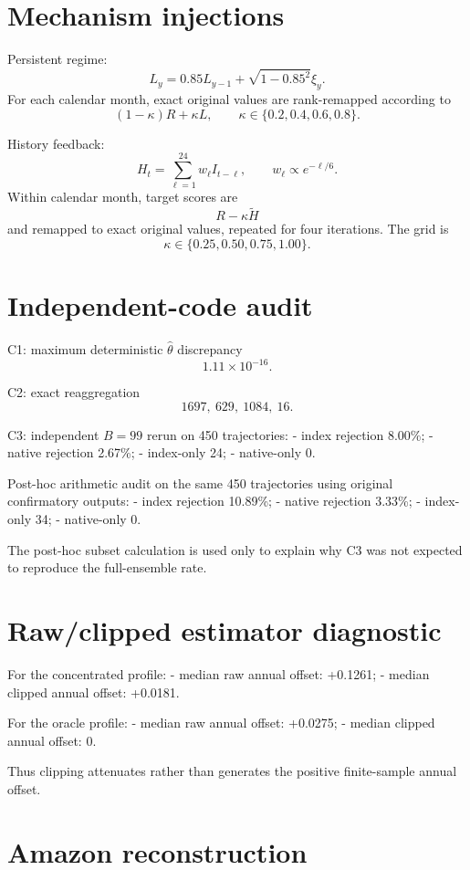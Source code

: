 \section{Mechanism injections}\label{mechanism-injections}

Persistent regime: \[
L_y=0.85L_{y-1}+\sqrt{1-0.85^2}\xi_y.
\] For each calendar month, exact original values are rank-remapped according to \[
(1-\kappa)R+\kappa L,
\qquad
\kappa\in\{0.2,0.4,0.6,0.8\}.
\]

History feedback: \[
H_t=\sum_{\ell=1}^{24}w_\ell I_{t-\ell},
\qquad
w_\ell\propto e^{-\ell/6}.
\] Within calendar month, target scores are \[
R-\kappa\widetilde H
\] and remapped to exact original values, repeated for four iterations. The grid is \[
\kappa\in\{0.25,0.50,0.75,1.00\}.
\]

\section{Independent-code audit}\label{independent-code-audit}

C1: maximum deterministic \(\hat\theta\) discrepancy \[
1.11\times10^{-16}.
\]

C2: exact reaggregation \[
1697,\ 629,\ 1084,\ 16.
\]

C3: independent \(B=99\) rerun on 450 trajectories: - index rejection 8.00\%; - native rejection 2.67\%; - index-only 24; - native-only 0.

Post-hoc arithmetic audit on the same 450 trajectories using original confirmatory outputs: - index rejection 10.89\%; - native rejection 3.33\%; - index-only 34; - native-only 0.

The post-hoc subset calculation is used only to explain why C3 was not expected to reproduce the full-ensemble rate.

\section{Raw/clipped estimator diagnostic}\label{rawclipped-estimator-diagnostic}

For the concentrated profile: - median raw annual offset: +0.1261; - median clipped annual offset: +0.0181.

For the oracle profile: - median raw annual offset: +0.0275; - median clipped annual offset: 0.

Thus clipping attenuates rather than generates the positive finite-sample annual offset.

\section{Amazon reconstruction}\label{amazon-reconstruction}

